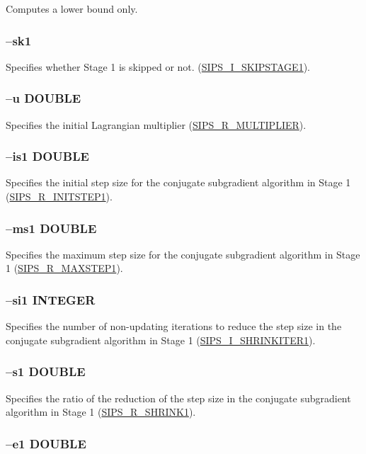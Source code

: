 \documentclass[a4paper]{book}
\begin{document}
Computes a lower bound only.

\subsubsection{--sk1}

Specifies whether Stage 1 is skipped or not.
(\hyperlink{SKIPSTAGE1}{SIPS\_I\_SKIPSTAGE1}).

\subsubsection{--u DOUBLE}

Specifies the initial Lagrangian multiplier
(\hyperlink{MULTIPLIER}{SIPS\_R\_MULTIPLIER}).

\subsubsection{--is1 DOUBLE}

Specifies the initial step size for the conjugate subgradient algorithm in Stage 1
(\hyperlink{INITSTEP1}{SIPS\_R\_INITSTEP1}).

\subsubsection{--ms1 DOUBLE}

Specifies the maximum step size for the conjugate subgradient algorithm in Stage 1
(\hyperlink{MAXSTEP1}{SIPS\_R\_MAXSTEP1}).

\subsubsection{--si1 INTEGER}

Specifies the number of non-updating iterations to reduce the step size in the conjugate subgradient algorithm in Stage 1
(\hyperlink{SHRINKITER1}{SIPS\_I\_SHRINKITER1}).

\subsubsection{--s1 DOUBLE}

Specifies the ratio of the reduction of the step size in the conjugate subgradient algorithm in Stage 1
(\hyperlink{SHRINK1}{SIPS\_R\_SHRINK1}).

\subsubsection{--e1 DOUBLE}
\end{document}

